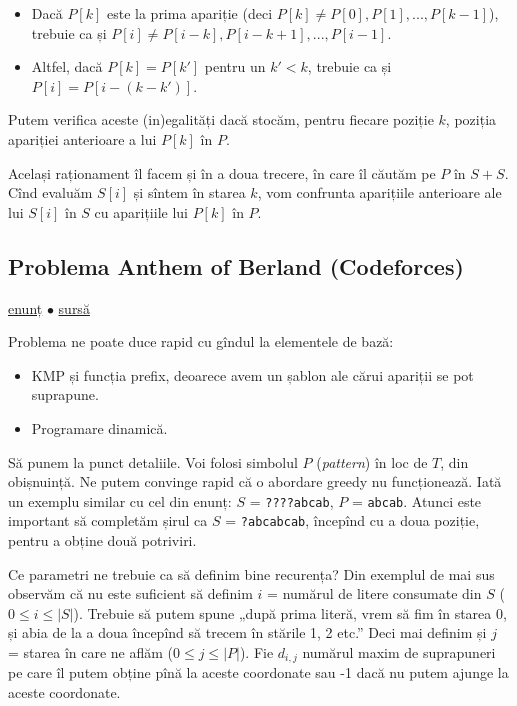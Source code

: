 \documentclass[../main.tex]{subfiles}
\begin{document}
\begin{itemize}
  \item Dacă $P[k]$ este la prima apariție (deci $P[k] \neq P[0], P[1], ..., P[k-1]$), trebuie ca și $P[i] \neq P[i - k], P[i - k + 1], ..., P[i - 1]$.
  \item Altfel, dacă $P[k] = P[k']$ pentru un $k' < k$, trebuie ca și $P[i] = P[i - (k - k')]$.
\end{itemize}

Putem verifica aceste (in)egalități dacă stocăm, pentru fiecare poziție $k$, poziția apariției anterioare a lui $P[k]$ în $P$.

Același raționament îl facem și în a doua trecere, în care îl căutăm pe $P$ în $S + S$. Cînd evaluăm $S[i]$ și sîntem în starea $k$, vom confrunta aparițiile anterioare ale lui $S[i]$ în $S$ cu aparițiile lui $P[k]$ în $P$.

\subsection{Problema Anthem of Berland (Codeforces)}
\label{problem:anthem-of-berland}

\href{https://kilonova.ro/problems/1862}{enunț}
$\bullet$
\hyperref[code:anthem-of-berland]{sursă}

Problema ne poate duce rapid cu gîndul la elementele de bază:

\begin{itemize}
  \item KMP și funcția prefix, deoarece avem un șablon ale cărui apariții se pot suprapune.
  \item Programare dinamică.
\end{itemize}

Să punem la punct detaliile. Voi folosi simbolul $P$ (\textit{pattern}) în loc de $T$, din obișnuință. Ne putem convinge rapid că o abordare greedy nu funcționează. Iată un exemplu similar cu cel din enunț: $S$ = \texttt{????abcab}, $P$ = \texttt{abcab}. Atunci este important să completăm șirul ca $S$ = \texttt{?abcabcab}, începînd cu a doua poziție, pentru a obține două potriviri.

Ce parametri ne trebuie ca să definim bine recurența? Din exemplul de mai sus observăm că nu este suficient să definim $i$ = numărul de litere consumate din $S$ ($0 \leq i \leq |S|$). Trebuie să putem spune „după prima literă, vrem să fim în starea 0, și abia de la a doua începînd să trecem în stările 1, 2 etc.” Deci mai definim și $j$ = starea în care ne aflăm ($0 \leq j \leq |P|$). Fie $d_{i,j}$ numărul maxim de suprapuneri pe care îl putem obține pînă la aceste coordonate sau -1 dacă nu putem ajunge la aceste coordonate.
\end{document}
